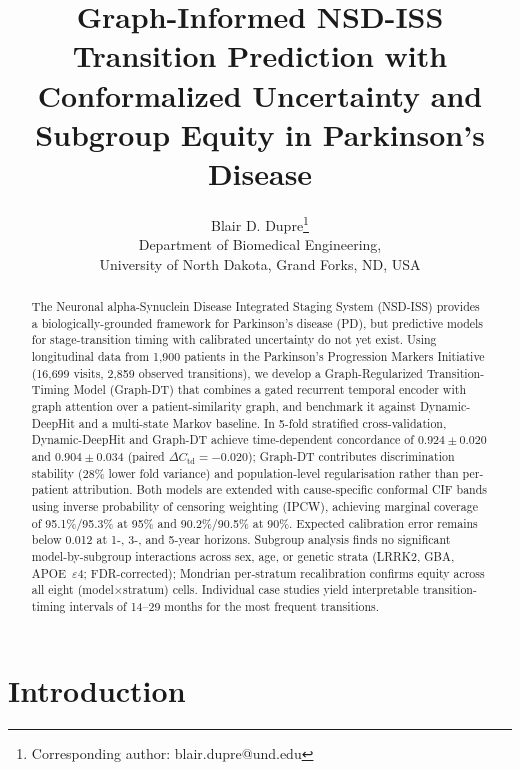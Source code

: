 \documentclass[11pt]{article}
\title{Graph-Informed NSD-ISS Transition Prediction with Conformalized Uncertainty and Subgroup Equity in Parkinson's Disease}
\author{Blair D. Dupre\thanks{Corresponding author: blair.dupre@und.edu}\\[0.5em]
Department of Biomedical Engineering,\\
University of North Dakota, Grand Forks, ND, USA}
\date{}
\begin{document}
\maketitle

\begin{abstract}
\noindent The Neuronal alpha-Synuclein Disease Integrated Staging System (NSD-ISS) provides a biologically-grounded framework for Parkinson's disease (PD), but predictive models for stage-transition timing with calibrated uncertainty do not yet exist. Using longitudinal data from 1{,}900 patients in the Parkinson's Progression Markers Initiative (16{,}699 visits, 2{,}859 observed transitions), we develop a Graph-Regularized Transition-Timing Model (Graph-DT) that combines a gated recurrent temporal encoder with graph attention over a patient-similarity graph, and benchmark it against Dynamic-DeepHit and a multi-state Markov baseline. In 5-fold stratified cross-validation, Dynamic-DeepHit and Graph-DT achieve time-dependent concordance of $0.924 \pm 0.020$ and $0.904 \pm 0.034$ (paired $\Delta C_\text{td} = -0.020$); Graph-DT contributes discrimination stability (28\% lower fold variance) and population-level regularisation rather than per-patient attribution. Both models are extended with cause-specific conformal CIF bands using inverse probability of censoring weighting (IPCW), achieving marginal coverage of 95.1\%/95.3\% at 95\% and 90.2\%/90.5\% at 90\%. Expected calibration error remains below 0.012 at 1-, 3-, and 5-year horizons. Subgroup analysis finds no significant model-by-subgroup interactions across sex, age, or genetic strata (LRRK2, GBA, APOE~$\varepsilon4$; FDR-corrected); Mondrian per-stratum recalibration confirms equity across all eight (model$\times$stratum) cells. Individual case studies yield interpretable transition-timing intervals of 14--29 months for the most frequent transitions.
\end{abstract}

\section{Introduction}
\label{sec:intro}
\end{document}

